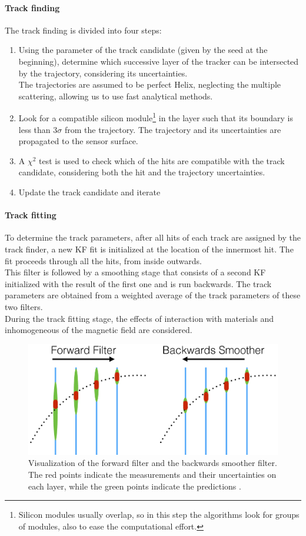 \paragraph*{Track finding}
The track finding is divided into four steps:
\begin{enumerate}
    \item Using the parameter of the track candidate (given by the seed at the beginning), determine which successive layer of the tracker can be intersected by the trajectory, considering its uncertainties.\\ The trajectories are assumed to be perfect Helix, neglecting the multiple scattering, allowing us to use fast analytical methods.
    \item Look for a compatible silicon module\footnote{Silicon modules usually overlap, so in this step the algorithms look for groups of modules, also to ease the computational effort.} in the layer such that its boundary is less than $3 \sigma$ from the trajectory. The trajectory and its uncertainties are propagated to the sensor surface.
    \item A $\chi^2$ test is used to check which of the hits are compatible with the track candidate, considering both the hit and the trajectory uncertainties.
    \item Update the track candidate and iterate
\end{enumerate}
\paragraph*{Track fitting}
To determine the track parameters, after all hits of each track are assigned by the track finder, a new KF fit is initialized at the location of the innermost hit. The fit proceeds through all the hits, from inside outwards.\\
This filter is followed by a smoothing stage that consists of a second KF initialized with the result of the first one and is run backwards. The track parameters are obtained from a weighted average of the track parameters of these two filters.\\
During the track fitting stage, the effects of interaction with materials and  inhomogeneous of the magnetic field are considered.

\begin{figure}[H]
    \centering
    \includegraphics[width=0.75\linewidth]{fig//chap04-reco/KF.png}
    \caption{Visualization of the forward filter and the backwards smoother filter. The red points indicate the measurements and their uncertainties on each layer, while the green points indicate the predictions \cite{Ai2021AFitting}.}
    \label{fig:KF}
\end{figure}

